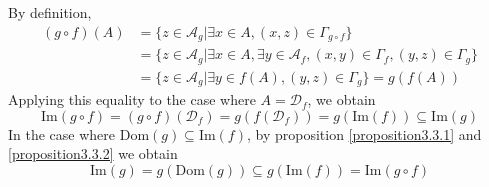 \documentclass{book}
\numberwithin{equation}{section}
\begin{document}
\begin{proofenv}
    By definition,
    \begin{align*}
        (g\circ f )(A)&=\{z\in \mathscr{A}_g|\exists x\in A,(x,z)\in \Gamma_{g\circ f}\}\\
        &=\{z\in \mathscr{A}_g|\exists x\in A,\exists y\in \mathscr{A}_f,(x,y)\in \Gamma_f,(y,z)\in \Gamma_g\}\\
        &=\{z\in \mathscr{A}_g|\exists  y\in f(A),(y,z)\in \Gamma_g\}=g(f(A))
    \end{align*}
    Applying this equality to the case where $A=\mathscr{D}_f$, we obtain
    $$\mathrm{Im}(g\circ f)=(g\circ f)(\mathscr{D}_f)=g(f(\mathscr{D}_f))=g(\mathrm{Im}(f))\subseteq \mathrm{Im}(g)$$
   In the case where $\mathrm{Dom}(g)\subseteq \mathrm{Im}(f)$, by proposition \ref{proposition3.3.1} and \ref{proposition3.3.2} we obtain 
   $$\mathrm{Im}(g)=g(\mathrm{Dom}(g))\subseteq g(\mathrm{Im}(f))=\mathrm{Im}(g\circ f)$$ 
\end{proofenv}
\end{document}
